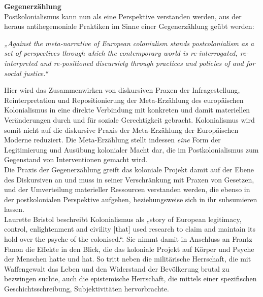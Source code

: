 \noindent\textbf{\large Gegenerzählung}\\
Postkolonialismus kann nun als eine Perspektive verstanden werden, aus der
heraus antihegemoniale Praktiken im Sinne einer Gegenerzählung geübt werden:
\begin{myenv}
  \textit{„Against the meta-narrative of European colonialism stands
  postcolonialism as a set of perspectives through which the contemporary world
is re-interrogated, re-interpreted and re-positioned discursivly through
practices and policies of and for social justice.“\footnotemark
{}}
\end{myenv}
Hier wird das Zusammenwirken von diskursiven Praxen der Infragestellung,
Reinterpretation und Repositionierung der Meta-Erzählung des europäischen
Kolonialismus in eine direkte Verbindung mit konkreten und damit materiellen
Veränderungen durch und für soziale Gerechtigkeit gebracht. Kolonialismus wird
somit nicht auf die diskursive Praxis der Meta-Erzählung der Europäischen
Moderne reduziert. Die Meta-Erzählung stellt indessen \textit{eine} Form der
Legitimierung und Ausübung kolonialer Macht dar, die im Postkolonialismus zum
Gegenstand von Interventionen gemacht wird.\footnotemark{}\\
Die Praxis der Gegenerzählung greift das
koloniale Projekt damit auf der Ebene des Diskursiven an und muss in seiner
Verschränkung mit Praxen von Gesetzen, und der Umverteilung materieller
Ressourcen verstanden werden, die ebenso in der postkolonialen Perspektive
aufgehen, beziehungsweise sich in ihr subsumieren lassen.\\

Laurette Bristol beschreibt Kolonialismus als „story of European legitimacy,
control, enlightenment and civility [that] used research to claim and maintain
its hold over the psyche of the colonised.“\footnotemark {}. Sie nimmt damit in Anschluss an
Frantz Fanon die Effekte in den Blick, die das koloniale Projekt auf Körper und
Psyche der Menschen hatte und hat. So tritt neben die militärische Herrschaft,
die mit Waffengewalt das Leben und den Widerstand der Bevölkerung brutal zu
bezwingen suchte, auch die epistemische Herrschaft, die mittels einer
spezifischen Geschichtsschreibung, Subjektivitäten
hervorbrachte.\footnotemark{}\\

